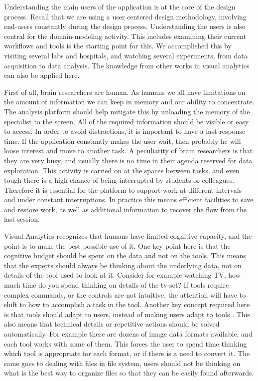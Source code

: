 Understanding the main users of the application is at the core of the design process. Recall that we are using a user centered design methodology, involving end-users constantly during the design process. Understanding the users is also central for the domain-modeling activity. This includes examining their current workflows and tools is the starting point for this. We accomplished this by visiting several labs and hospitals, and watching several experiments, from data acquisition to data analysis. The knowledge from other works in visual analytics can also be applied here. 

First of all, brain researchers are human. As humans we all have limitations on the amount of information we can keep in memory and our ability to concentrate. The analysis platform should help mitigate this by unloading the memory of the specialist to the screen. All of the required information should be visible or easy to access. In order to avoid distractions, it is important to have a fast response time. If the application constantly makes the user wait, then probably he will loose interest and move to another task. A peculiarity of brain researchers is that they are very busy, and usually there is no time in their agenda reserved for data exploration. This activity is carried on at the spaces between tasks, and even tough there is a high chance of being interrupted by students or colleagues. Therefore it is essential for the platform to support work at different intervals and under constant interruptions. In practice this means efficient facilities to save and restore work, as well as additional information to recover the flow from the last session. 

Visual Analytics recognizes that humans have limited cognitive capacity, and the point is to make the best possible use of it. One key point here is that the cognitive budget should be spent on the data and not on the tools. This means that the experts should always be thinking about the underlying data, not on details of the tool used to look at it. Consider for example watching TV, how much time do you spend thinking on details of the tv-set? If tools require complex commands, or the controls are not intuitive, the attention will have to shift to how to accomplish a task in the tool. Another key concept required here is that tools should adapt to users, instead of making users adapt to tools \autocite{norman_design_2002}. This also means that technical details or repetitive actions should be solved automatically. For example there are dozens of image data formats available, and each tool works with some of them. This forces the user to spend time thinking which tool is appropriate for each format, or if there is a need to convert it. The same goes to dealing with files in file system, users should not be thinking on what is the best way to organize files so that they can be easily found afterwards. 

